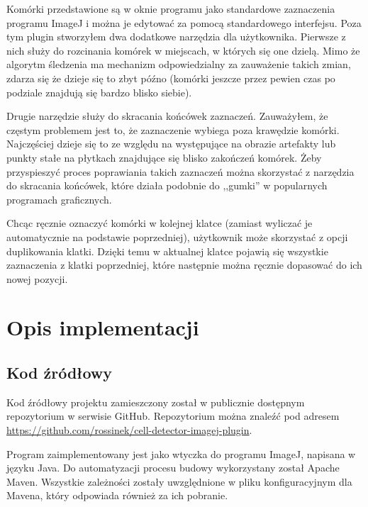 \documentclass[declaration,shortabstract,mgr]{iithesis}
\begin{document}
Komórki przedstawione są w oknie programu jako standardowe zaznaczenia programu ImageJ i można je edytować za pomocą standardowego interfejsu.
Poza tym plugin stworzyłem dwa dodatkowe narzędzia dla użytkownika.
Pierwsze z nich służy do rozcinania komórek w miejscach, w których się one dzielą.
Mimo że algorytm śledzenia ma mechanizm odpowiedzialny za zauważenie takich zmian, zdarza się że dzieje się to zbyt późno (komórki jeszcze przez pewien czas po podziale znajdują się bardzo blisko siebie).

Drugie narzędzie służy do skracania końcówek zaznaczeń.
Zauważyłem, że częstym problemem jest to, że zaznaczenie wybiega poza krawędzie komórki.
Najczęściej dzieje się to ze względu na występujące na obrazie artefakty lub punkty stałe na płytkach znajdujące się blisko zakończeń komórek.
Żeby przyspieszyć proces poprawiania takich zaznaczeń można skorzystać z narzędzia do skracania końcówek, które działa podobnie do ,,gumki'' w popularnych programach graficznych.

Chcąc ręcznie oznaczyć komórki w kolejnej klatce (zamiast wyliczać je automatycznie na podstawie poprzedniej), użytkownik może skorzystać z opcji duplikowania klatki. Dzięki temu w aktualnej klatce pojawią się wszystkie zaznaczenia z klatki poprzedniej, które następnie można ręcznie dopasować do ich nowej pozycji.



\chapter{Opis implementacji}



\section{Kod źródłowy}

Kod źródłowy projektu zamieszczony został w publicznie dostępnym repozytorium w serwisie GitHub.
Repozytorium można znaleźć pod adresem
\linebreak\url{https://github.com/rossinek/cell-detector-imagej-plugin}.

Program zaimplementowany jest jako wtyczka do programu ImageJ, napisana w języku Java. Do automatyzacji procesu budowy wykorzystany został Apache Maven. Wszystkie zależności zostały uwzględnione w pliku konfiguracyjnym dla Mavena, który odpowiada również za ich pobranie.
\end{document}

